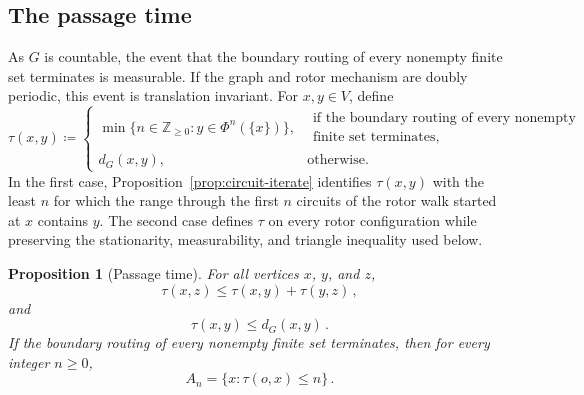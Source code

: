 \documentclass[11pt]{amsart}
\theoremstyle{plain}
\newtheorem{proposition}[theorem]{Proposition}
\theoremstyle{definition}
\newcommand{\Z}{\mathbb Z}
\begin{document}
	\subsection{The passage time}
	As $G$ is countable, the event that the boundary routing of every nonempty
	finite set terminates is measurable.  If the graph and rotor
	mechanism are doubly periodic, this event is translation invariant.
	For $x,y\in V$, define
	\begin{equation}\label{eq:passage-definition}
		\tau(x,y)
		\coloneqq
		\begin{cases}
			\min\{n\in\Z_{\geq0}:y\in\Phi^n(\{x\})\},
			&\begin{gathered}
				\text{if the boundary routing of every nonempty}\\
				\text{finite set terminates},
			\end{gathered}\\
			d_G(x,y),&\text{otherwise.}
		\end{cases}
	\end{equation}
	In the first case, Proposition~\ref{prop:circuit-iterate} identifies
	$\tau(x,y)$ with the least $n$ for which the range through the first $n$
	circuits of the rotor walk started at $x$ contains $y$.  The second case
	defines $\tau$ on every rotor configuration while preserving the stationarity,
	measurability, and triangle inequality used below.
	
	\begin{proposition}[Passage time]\label{prop:passage}
		For all vertices $x$, $y$, and $z$,
		\begin{equation}\label{eq:triangle}
			\tau(x,z)\leq\tau(x,y)+\tau(y,z)\, ,
		\end{equation}
		and
		\begin{equation}\label{eq:passage-upper}
			\tau(x,y)\leq d_G(x,y)\, .
		\end{equation}
		If the boundary routing of every nonempty finite set terminates, then
		for every integer $n\geq0$,
		\begin{equation}\label{eq:passage-balls}
			A_n=\{x:\tau(o,x)\leq n\}\, .
		\end{equation}
	\end{proposition}
	
\end{document}

